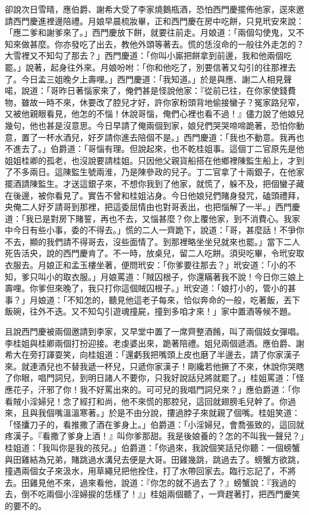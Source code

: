 卻說次日雪晴，應伯爵、謝希大受了李家燒鵝瓶酒，恐怕西門慶擺佈他家，逕來邀請西門慶進裡邊陪禮。月娘早晨梳妝畢，正和西門慶在房中吃餅，只見玳安來說：「應二爹和謝爹來了。」西門慶放下餅，就要往前走。月娘道：「兩個勾使鬼，又不知來做甚麼。你亦發吃了出去，教他外頭等著去。慌的恁沒命的一般往外走怎的？大雪裡又不知勾了那去？」西門慶道：「你叫小廝把餅拿到前邊，我和他兩個吃罷。」說著，起身往外來。月娘吩咐：「你和他吃了，別要信著又勾引的往那裡去了。今日孟三姐晚夕上壽哩。」西門慶道：「我知道。」於是與應、謝二人相見聲喏，說道：「哥昨日著惱家來了，俺們甚是怪說他家：『從前已往，在你家使錢費物，雖故一時不來，休要改了腔兒才好，許你家粉頭背地偷接蠻子？冤家路兒窄，又被他親眼看見，他怎的不惱！休說哥惱，俺們心裡也看不過！』儘力說了他娘兒幾句，他也甚是沒意思。今日早請了俺兩個到家，娘兒們哭哭啼啼跪著，恐怕你動意，置了一杯水酒兒，好歹請你進去陪個不是。」西門慶道：「我也不動意。我再也不進去了。」伯爵道：「哥惱有理。但說起來，也不乾桂姐事。這個丁二官原先是他姐姐桂卿的孤老，也沒說要請桂姐。只因他父親貨船搭在他鄉裡陳監生船上，才到了不多兩日。這陳監生號兩淮，乃是陳參政的兒子。丁二官拿了十兩銀子，在他家擺酒請陳監生。才送這銀子來，不想你我到了他家，就慌了，躲不及，把個蠻子藏在後邊，被你看見了。實告不曾和桂姐沾身。今日他娘兒們賭身發咒，磕頭禮拜，央俺二人好歹請哥到那裡，把這委屈情由也對哥表出，也把惱解了一半。」西門慶道：「我已是對房下賭誓，再也不去，又惱甚麼？你上覆他家，到不消費心。我家中今日有些小事，委的不得去。」慌的二人一齊跪下，說道：「哥，甚麼話！不爭你不去，顯的我們請不得哥去，沒些面情了。到那裡略坐坐兒就來也罷。」當下二人死告活央，說的西門慶肯了。不一時，放桌兒，留二人吃餅。須臾吃畢，令玳安取衣服去。月娘正和孟玉樓坐著，便問玳安：「你爹要往那去？」玳安道：「小的不知，爹只叫小的取衣服。」月娘罵道：「賊囚根子，你還瞞著我不說！今日你三娘上壽哩。你爹但來晚了，我只打你這個賊囚根子。」玳安道：「娘打小的，管小的甚事？」月娘道：「不知怎的，聽見他這老子每來，恰似奔命的一般，吃著飯，丟下飯碗，往外不迭。又不知勾引遊魂撞屍，撞到多咱才來！」家中置酒等候不題。

且說西門慶被兩個邀請到李家，又早堂中置了一席齊整酒餚，叫了兩個妓女彈唱。李桂姐與桂卿兩個打扮迎接。老虔婆出來，跪著陪禮。姐兒兩個遞酒。應伯爵、謝希大在旁打諢耍笑，向桂姐道：「還虧我把嘴頭上皮也磨了半邊去，請了你家漢子來。就連酒兒也不替我遞一杯兒，只遞你家漢子！剛纔若他撅了不來，休說你哭瞎了你眼，唱門詞兒，到明日諸人不要你，只我好說話兒將就罷了。」桂姐罵道：「怪應花子，汗邪了你！我不好罵出來的。可可兒的我唱門詞兒來？」應伯爵道：「你看賊小淫婦兒！念了經打和尚，他不來慌的那腔兒，這回就翅膀毛兒幹了。你過來，且與我個嘴溫溫寒著。」於是不由分說，摟過脖子來就親了個嘴。桂姐笑道：「怪攮刀子的，看推撒了酒在爹身上。」伯爵道：「小淫婦兒，會喬張致的，這回就疼漢子。『看撒了爹身上酒！』叫你爹那甜。我是後娘養的？怎的不叫我一聲兒？」桂姐道：「我叫你是我的孩兒。」伯爵道：「你過來，我說個笑話兒你聽：一個螃蟹與田雞結為兄弟，賭跳過水溝兒去便是大哥。田雞幾跳，跳過去了。螃蟹方欲跳，撞遇兩個女子來汲水，用草繩兒把他拴住，打了水帶回家去。臨行忘記了，不將去。田雞見他不來，過來看他，說道：『你怎的就不過去了？』螃蟹說：『我過的去，倒不吃兩個小淫婦捩的恁樣了！』」桂姐兩個聽了，一齊趕著打，把西門慶笑的要不的。

